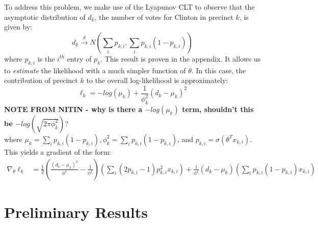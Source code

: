 \documentclass[10pt, letterpaper]{article}
\begin{document}
To address this problem, we make use of the Lyapunov CLT to observe that the asymptotic distribution of $d_k$, the number of votes for Clinton in precinct $k$, is given by: 
\[ d_k \stackrel{d} \longrightarrow N \left(\sum_{i} p_{k,i}, \sum_{i} p_{k, i}(1-p_{k, i}) \right) \] 
where $p_{k, i}$ is the $i^{th}$ entry of $p_k$. This result is proven in the appendix. It allows us to \emph{estimate} the likelihood with a much simpler function of $\theta$. In this case, the contribution of precinct $k$ to the overall log-likelihood is approximately: 
\[ \ell_k = -log \left( \mu_k\right) + \frac{1}{\phi_k^2} \left( d_k -\mu_k \right)^2  \] 
\textbf{NOTE FROM NITIN - why is there a $-log \left( \mu_k\right)$ term, shouldn't this be $-log \left( \sqrt{2 \pi \phi^2_k}\right)$}? \\
where $\mu_k =  \sum_{i} p_{k, i}(1-p_{k, i}), \phi_k^2 = \sum_{i} p_{k, i}(1-p_{k, i})$, and $p_{k, i} = \sigma(\theta^T x_{k, i})$. This yields a gradient of the form: 
\begin{align*}
\nabla_{\theta} \ell_k &=  \frac{1}{2} \left(\frac{(d_k - \mu_k)^2}{\phi^4} - \frac{1}{\phi^2} \right) \left( \sum_{i} (2 p_{k, i} - 1)p_{k, i}^2 x_{k, i} \right) + \frac{1}{\phi^2} (d_k - \mu_k) \left( \sum_i p_{k, i} (1 - p_{k, i}) x_{k, i} \right)
\end{align*}





\section{Preliminary Results}
\end{document}
